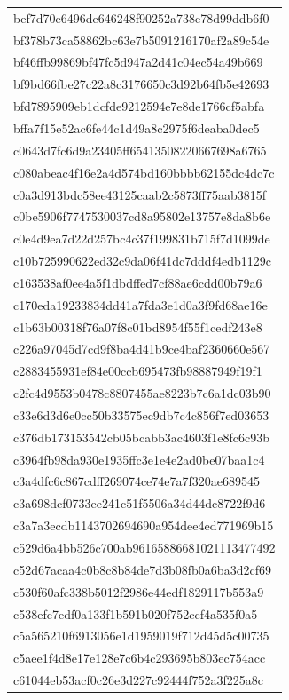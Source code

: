 \begin{tabular}{l}
bef7d70e6496de646248f90252a738e78d99ddb6f0 \\
bf378b73ca58862bc63e7b5091216170af2a89c54e \\
bf46ffb99869bf47fc5d947a2d41c04ec54a49b669 \\
bf9bd66fbe27c22a8c3176650c3d92b64fb5e42693 \\
bfd7895909eb1dcfde9212594e7e8de1766cf5abfa \\
bffa7f15e52ac6fe44c1d49a8c2975f6deaba0dec5 \\
c0643d7fc6d9a23405ff65413508220667698a6765 \\
c080abeac4f16e2a4d574bd160bbbb62155dc4dc7c \\
c0a3d913bdc58ee43125caab2c5873ff75aab3815f \\
c0be5906f7747530037cd8a95802e13757e8da8b6e \\
c0e4d9ea7d22d257bc4c37f199831b715f7d1099de \\
c10b725990622ed32c9da06f41dc7dddf4edb1129c \\
c163538af0ee4a5f1dbdffed7cf88ae6cdd00b79a6 \\
c170eda19233834dd41a7fda3e1d0a3f9fd68ae16e \\
c1b63b00318f76a07f8c01bd8954f55f1cedf243e8 \\
c226a97045d7cd9f8ba4d41b9ce4baf2360660e567 \\
c2883455931ef84e00ccb695473fb98887949f19f1 \\
c2fc4d9553b0478c8807455ae8223b7c6a1dc03b90 \\
c33e6d3d6e0cc50b33575ec9db7c4c856f7ed03653 \\
c376db173153542cb05bcabb3ac4603f1e8fc6c93b \\
c3964fb98da930e1935ffc3e1e4e2ad0be07baa1c4 \\
c3a4dfc6c867cdff269074ce74e7a7f320ae689545 \\
c3a698dcf0733ee241c51f5506a34d44dc8722f9d6 \\
c3a7a3ecdb1143702694690a954dee4ed771969b15 \\
c529d6a4bb526c700ab96165886681021113477492 \\
c52d67acaa4c0b8c8b84de7d3b08fb0a6ba3d2cf69 \\
c530f60afc338b5012f2986e44edf1829117b553a9 \\
c538efc7edf0a133f1b591b020f752ccf4a535f0a5 \\
c5a565210f6913056e1d1959019f712d45d5c00735 \\
c5aee1f4d8e17e128e7c6b4c293695b803ec754acc \\
c61044eb53acf0c26e3d227c92444f752a3f225a8c \\

\end{tabular}
